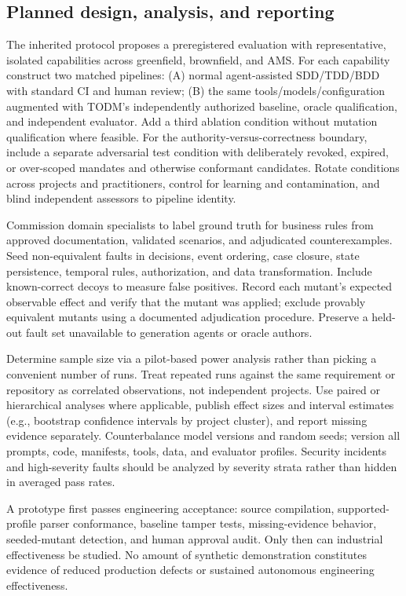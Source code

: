 \documentclass[11pt,a4paper]{article}
\begin{document}
\subsection{Planned design, analysis, and reporting}
The inherited protocol proposes a preregistered evaluation with representative, isolated capabilities across greenfield, brownfield, and AMS. For each capability construct two matched pipelines: (A) normal agent-assisted SDD/TDD/BDD with standard CI and human review; (B) the same tools/models/configuration augmented with TODM's independently authorized baseline, oracle qualification, and independent evaluator. Add a third ablation condition without mutation qualification where feasible. For the authority-versus-correctness boundary, include a separate adversarial test condition with deliberately revoked, expired, or over-scoped mandates and otherwise conformant candidates. Rotate conditions across projects and practitioners, control for learning and contamination, and blind independent assessors to pipeline identity.

Commission domain specialists to label ground truth for business rules from approved documentation, validated scenarios, and adjudicated counterexamples. Seed non-equivalent faults in decisions, event ordering, case closure, state persistence, temporal rules, authorization, and data transformation. Include known-correct decoys to measure false positives. Record each mutant's expected observable effect and verify that the mutant was applied; exclude provably equivalent mutants using a documented adjudication procedure. Preserve a held-out fault set unavailable to generation agents or oracle authors.

Determine sample size via a pilot-based power analysis rather than picking a convenient number of runs. Treat repeated runs against the same requirement or repository as correlated observations, not independent projects. Use paired or hierarchical analyses where applicable, publish effect sizes and interval estimates (e.g., bootstrap confidence intervals by project cluster), and report missing evidence separately. Counterbalance model versions and random seeds; version all prompts, code, manifests, tools, data, and evaluator profiles. Security incidents and high-severity faults should be analyzed by severity strata rather than hidden in averaged pass rates.

A prototype first passes engineering acceptance: source compilation, supported-profile parser conformance, baseline tamper tests, missing-evidence behavior, seeded-mutant detection, and human approval audit. Only then can industrial effectiveness be studied. No amount of synthetic demonstration constitutes evidence of reduced production defects or sustained autonomous engineering effectiveness.
\end{document}
